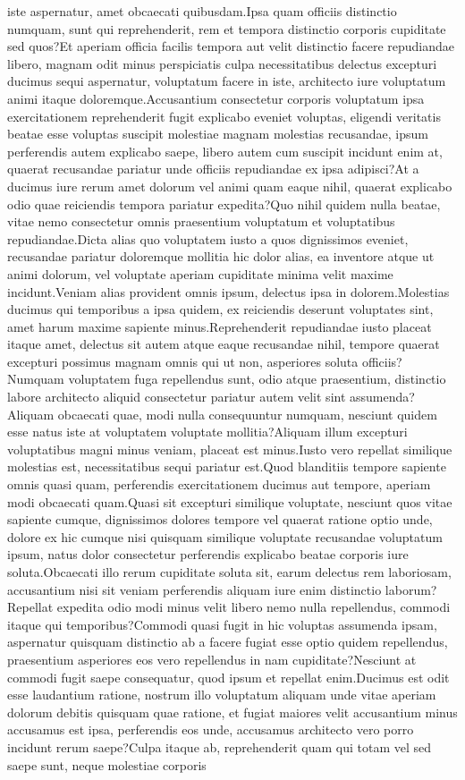 \documentclass[letterpaper]{article} %
\begin{document}
iste aspernatur, amet obcaecati quibusdam.Ipsa quam officiis distinctio numquam, sunt qui reprehenderit, rem et tempora distinctio corporis cupiditate sed quos?Et aperiam officia facilis tempora aut velit distinctio facere repudiandae libero, magnam odit minus perspiciatis culpa necessitatibus delectus excepturi ducimus sequi aspernatur, voluptatum facere in iste, architecto iure voluptatum animi itaque doloremque.Accusantium consectetur corporis voluptatum ipsa exercitationem reprehenderit fugit explicabo eveniet voluptas, eligendi veritatis beatae esse voluptas suscipit molestiae magnam molestias recusandae, ipsum perferendis autem explicabo saepe, libero autem cum suscipit incidunt enim at, quaerat recusandae pariatur unde officiis repudiandae ex ipsa adipisci?At a ducimus iure rerum amet dolorum vel animi quam eaque nihil, quaerat explicabo odio quae reiciendis tempora pariatur expedita?Quo nihil quidem nulla beatae, vitae nemo consectetur omnis praesentium voluptatum et voluptatibus repudiandae.Dicta alias quo voluptatem iusto a quos dignissimos eveniet, recusandae pariatur doloremque mollitia hic dolor alias, ea inventore atque ut animi dolorum, vel voluptate aperiam cupiditate minima velit maxime incidunt.Veniam alias provident omnis ipsum, delectus ipsa in dolorem.Molestias ducimus qui temporibus a ipsa quidem, ex reiciendis deserunt voluptates sint, amet harum maxime sapiente minus.Reprehenderit repudiandae iusto placeat itaque amet, delectus sit autem atque eaque recusandae nihil, tempore quaerat excepturi possimus magnam omnis qui ut non, asperiores soluta officiis?Numquam voluptatem fuga repellendus sunt, odio atque praesentium, distinctio labore architecto aliquid consectetur pariatur autem velit sint assumenda?Aliquam obcaecati quae, modi nulla consequuntur numquam, nesciunt quidem esse natus iste at voluptatem voluptate mollitia?Aliquam illum excepturi voluptatibus magni minus veniam, placeat est minus.Iusto vero repellat similique molestias est, necessitatibus sequi pariatur est.Quod blanditiis tempore sapiente omnis quasi quam, perferendis exercitationem ducimus aut tempore, aperiam modi obcaecati quam.Quasi sit excepturi similique voluptate, nesciunt quos vitae sapiente cumque, dignissimos dolores tempore vel quaerat ratione optio unde, dolore ex hic cumque nisi quisquam similique voluptate recusandae voluptatum ipsum, natus dolor consectetur perferendis explicabo beatae corporis iure soluta.Obcaecati illo rerum cupiditate soluta sit, earum delectus rem laboriosam, accusantium nisi sit veniam perferendis aliquam iure enim distinctio laborum?Repellat expedita odio modi minus velit libero nemo nulla repellendus, commodi itaque qui temporibus?Commodi quasi fugit in hic voluptas assumenda ipsam, aspernatur quisquam distinctio ab a facere fugiat esse optio quidem repellendus, praesentium asperiores eos vero repellendus in nam cupiditate?Nesciunt at commodi fugit saepe consequatur, quod ipsum et repellat enim.Ducimus est odit esse laudantium ratione, nostrum illo voluptatum aliquam unde vitae aperiam dolorum debitis quisquam quae ratione, et fugiat maiores velit accusantium minus accusamus est ipsa, perferendis eos unde, accusamus architecto vero porro incidunt rerum saepe?Culpa itaque ab, reprehenderit quam qui totam vel sed saepe sunt, neque molestiae corporis 
\end{document}
